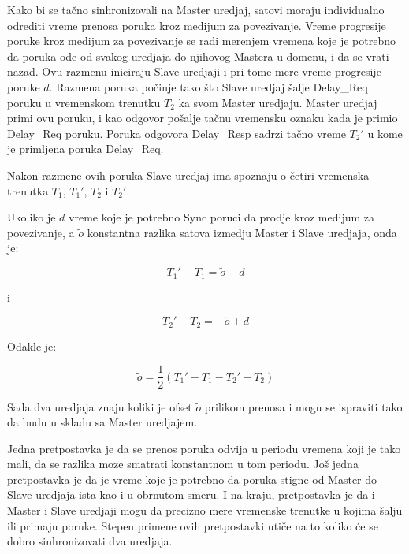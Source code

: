 \documentclass[a4paper,12pt, master]{etf}
\begin{document}
	Kako bi se ta\v{c}no sinhronizovali na Master uredjaj, satovi moraju
	individualno odrediti vreme prenosa poruka kroz medijum za povezivanje.
	Vreme progresije poruke kroz medijum za	povezivanje	se radi merenjem
	vremena koje je potrebno da poruka ode od svakog uredjaja do njihovog
	Mastera u domenu, i da se vrati nazad. Ovu razmenu iniciraju Slave uredjaji
	i pri tome mere vreme progresije poruke $d$. Razmena poruka po\v{c}inje
	tako \v{s}to Slave uredjaj \v{s}alje Delay\_Req poruku u vremenskom
	trenutku $T_2$ ka svom Master uredjaju. Master uredjaj primi ovu poruku, i
	kao	odgovor po\v{s}alje ta\v{c}nu vremensku oznaku kada je primio Delay\_Req
	poruku. Poruka odgovora	Delay\_Resp sadrzi ta\v{c}no vreme $T_2'$ u kome je
	primljena poruka Delay\_Req.

	Nakon razmene ovih poruka Slave uredjaj ima spoznaju o \v{c}etiri vremenska
	trenutka $T_1$,	$T_1'$,	$T_2$ i $T_2'$.

	Ukoliko je $d$ vreme koje je potrebno Sync poruci da prodje kroz medijum za
	povezivanje, a $\tilde{o}$ konstantna razlika satova izmedju Master i Slave
	uredjaja, onda je:

	\begin{equation}
		T_1' - T_1 = \tilde{o} + d
	\end{equation}

	i

	\begin{equation}
			T_2' - T_2 = -\tilde{o} + d
	\end{equation}

	Odakle je:

	\begin{equation}
		\tilde{o} = \frac{1}{2} (T_1' - T_1 - T_2' + T_2)
	\end{equation}

	Sada dva uredjaja znaju koliki je ofset $\tilde{o}$ prilikom prenosa i mogu
	se ispraviti tako da budu u skladu sa Master uredjajem.

	Jedna pretpostavka je da se prenos poruka odvija u periodu vremena koji je
	tako mali, da se razlika moze smatrati konstantnom u tom periodu. Jo\v{s}
	jedna pretpostavka je da je vreme koje je potrebno da poruka stigne od
	Master do Slave uredjaja ista kao i u obrnutom smeru. I na kraju,
	pretpostavka je da i Master i Slave uredjaji mogu da precizno mere
	vremenske trenutke u kojima \v{s}alju ili primaju poruke. Stepen primene
	ovih pretpostavki uti\v{c}e na to koliko \'{c}e se dobro sinhronizovati dva
	uredjaja.

	\newpage
\end{document}
